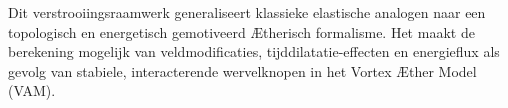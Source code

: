 Dit verstrooiingsraamwerk generaliseert klassieke elastische analogen naar een topologisch en energetisch gemotiveerd Ætherisch formalisme. Het maakt de berekening mogelijk van veldmodificaties, tijddilatatie-effecten en energieflux als gevolg van stabiele, interacterende wervelknopen in het Vortex Æther Model (VAM).